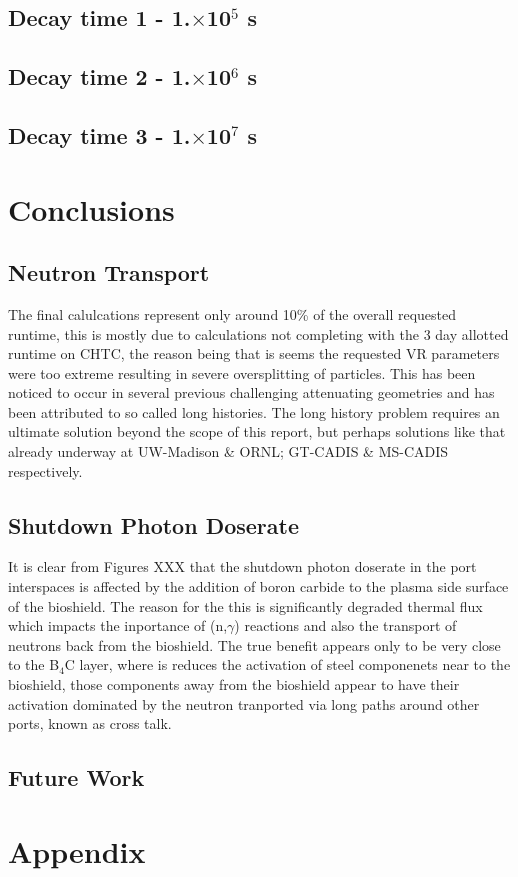\documentclass[12pt]{article}
\begin{document}
\subsection{Decay time 1 - 1.$\times$10$^5$ s}
\subsection{Decay time 2 - 1.$\times$10$^6$ s}
\subsection{Decay time 3 - 1.$\times$10$^7$ s}
\section{Conclusions}
\subsection{Neutron Transport}
The final calulcations represent only around 10\% of the overall requested runtime, this is mostly due to calculations not completing with the 3 day allotted runtime on CHTC, the reason being that is seems the requested VR parameters were too extreme resulting in severe oversplitting of particles. This has been noticed to occur in several previous challenging attenuating geometries and has been attributed to so called long histories. The long history problem requires an ultimate solution beyond the scope of this report, but perhaps solutions like that already underway at UW-Madison \& ORNL; GT-CADIS \& MS-CADIS respectively.
\subsection{Shutdown Photon Doserate}
It is clear from Figures XXX that the shutdown photon doserate in the port interspaces is affected by the addition of boron carbide to the plasma side surface of the bioshield. The reason for the this is significantly degraded thermal flux which impacts the inportance of (n,$\gamma$) reactions and also the transport of neutrons back from the bioshield. The true benefit appears only to be very close to the B$_4$C layer, where is reduces the activation of steel componenets near to the bioshield, those components away from the bioshield appear to have their activation dominated by the neutron tranported via long paths around other ports, known as cross talk.
\subsection{Future Work}


\newpage
\section{Appendix}

\end{document}
